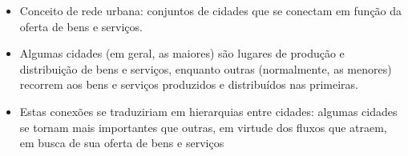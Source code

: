 

\begin{block}{}
\begin{itemize}
	\item Conceito de rede urbana: conjuntos de cidades que se conectam em função da oferta de bens e serviços.
	\item Algumas cidades (em geral, as maiores) são lugares de produção e distribuição de bens e serviços, enquanto outras (normalmente, as menores) recorrem aos bens e serviços produzidos e distribuídos nas primeiras.
	\item Estas conexões se traduziriam em hierarquias entre cidades: algumas cidades se tornam mais importantes que outras, em virtude dos fluxos que atraem, em busca de sua oferta de bens e serviços
	
\end{itemize}
\end{block}

	

